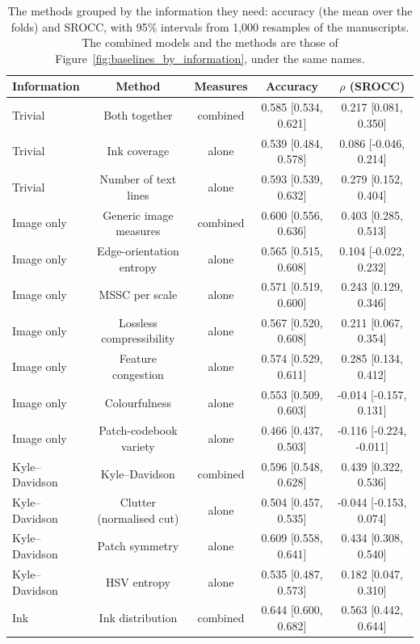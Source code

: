 \begin{table}[htbp]
  \centering
  \caption{The methods grouped by the information they need: accuracy (the mean over the folds) and SROCC, with 95\% intervals from 1,000 resamples of the manuscripts. The combined models and the methods are those of Figure~\ref{fig:baselines_by_information}, under the same names.}
  \label{tab:baselines_by_information_each_measure}
  \begin{tabular}{lcccc}
    \toprule
    Information & Method & Measures & Accuracy & $\rho$ (SROCC) \\
    \midrule
    Trivial & Both together & combined & 0.585 [0.534, 0.621] & 0.217 [0.081, 0.350] \\
    Trivial & Ink coverage & alone & 0.539 [0.484, 0.578] & 0.086 [-0.046, 0.214] \\
    Trivial & Number of text lines & alone & 0.593 [0.539, 0.632] & 0.279 [0.152, 0.404] \\
    Image only & Generic image measures & combined & 0.600 [0.556, 0.636] & 0.403 [0.285, 0.513] \\
    Image only & Edge-orientation entropy & alone & 0.565 [0.515, 0.608] & 0.104 [-0.022, 0.232] \\
    Image only & MSSC per scale & alone & 0.571 [0.519, 0.600] & 0.243 [0.129, 0.346] \\
    Image only & Lossless compressibility & alone & 0.567 [0.520, 0.608] & 0.211 [0.067, 0.354] \\
    Image only & Feature congestion & alone & 0.574 [0.529, 0.611] & 0.285 [0.134, 0.412] \\
    Image only & Colourfulness & alone & 0.553 [0.509, 0.603] & -0.014 [-0.157, 0.131] \\
    Image only & Patch-codebook variety & alone & 0.466 [0.437, 0.503] & -0.116 [-0.224, -0.011] \\
    Kyle--Davidson & Kyle--Davidson & combined & 0.596 [0.548, 0.628] & 0.439 [0.322, 0.536] \\
    Kyle--Davidson & Clutter (normalised cut) & alone & 0.504 [0.457, 0.535] & -0.044 [-0.153, 0.074] \\
    Kyle--Davidson & Patch symmetry & alone & 0.609 [0.558, 0.641] & 0.434 [0.308, 0.540] \\
    Kyle--Davidson & HSV entropy & alone & 0.535 [0.487, 0.573] & 0.182 [0.047, 0.310] \\
    Ink & Ink distribution & combined & 0.644 [0.600, 0.682] & 0.563 [0.442, 0.644] \\

\end{tabular}
\end{table}
